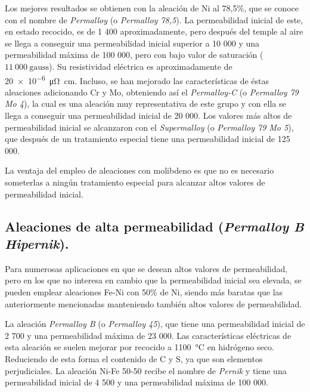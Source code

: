\documentclass[12pt,a4paper]{article}
\begin{document}
Los mejores resultados se obtienen con la aleación de Ni al 78,5\%, que se conoce con el nombre de \textit{Permalloy} (o \textit{Permalloy 78,5}). La permeabilidad inicial de este, en estado recocido, es de 1 400 aproximadamente, pero después del temple al aire se llega a conseguir una permeabilidad inicial superior a 10 000 y una permeabilidad máxima de 100 000, pero con bajo valor de saturación ($11\ 000\ \mathrm{gauss}$). Su resistividad eléctrica es aproximadamente de \SI{20e-6}{\micro\ohm\centi\metre}. Incluso, se han mejorado las características de éstas aleaciones adicionando Cr y Mo, obteniendo así el \textit{Permalloy-C} (o \textit{Permalloy 79 Mo 4}), la cual es una aleación muy representativa de este grupo y con ella se llega a conseguir una permeabilidad inicial de 20 000. Los valores más altos de permeabilidad inicial se alcanzaron con el \textit{Supermalloy} (o \textit{Permalloy 79 Mo 5}), que después de un tratamiento especial tiene una permeabilidad inicial de 125 000.

La ventaja del empleo de aleaciones con molibdeno es que no es necesario someterlas a ningún tratamiento especial para alcanzar altos valores de permeabilidad inicial.

\subsection{Aleaciones de alta permeabilidad (\textit{Permalloy B Hipernik}).}

Para numerosas aplicaciones en que se desean altos valores de permeabilidad, pero en los que no interesa en cambio que la permeabilidad inicial sea elevada, se pueden emplear aleaciones Fe-Ni con 50\% de Ni, siendo más baratas que las anteriormente mencionadas manteniendo también altos valores de permeabilidad.

La aleación \textit{Permalloy B} (o \textit{Permalloy 45}), que tiene una permeabilidad inicial de 2 700 y una permeabilidad máxima de 23 000. Las características eléctricas de esta aleación se suelen mejorar por recocido a \SI{1 100}{\celsius} en hidrógeno seco. Reduciendo de esta forma el contenido de C y S, ya que son elementos perjudiciales. La aleación Ni-Fe 50-50 recibe el nombre de \textit{Pernik} y tiene una permeabilidad inicial de 4 500 y una permeabilidad máxima de 100 000.
\end{document}
